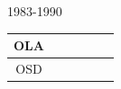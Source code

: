 \documentclass[ xcolor = pdftex, dvipsnames, table ]{beamer}
\begin{document}
\begin{frame}{1983-1990}
\begin{minipage}[c]{0.49\textwidth}
{\begin{tabular}{|c|c|c|c|c|c|}
        OLA&\cellcolor[HTML]{984EA3}&\cellcolor[HTML]{FF7F00}&\cellcolor[HTML]{984EA3}&\cellcolor[HTML]{FF7F00}&\cellcolor[HTML]{984EA3}\\ \hline %
        OSD&\cellcolor[HTML]{984EA3}&\cellcolor[HTML]{FF7F00}&\cellcolor[HTML]{984EA3}&\cellcolor[HTML]{FF7F00}&\cellcolor[HTML]{984EA3}\\ \hline %

\end{tabular}}
\end{minipage}
\end{frame}
\end{document}
